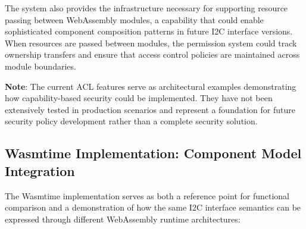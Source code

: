 The system also provides the infrastructure necessary for supporting resource passing between WebAssembly modules, a capability that could enable sophisticated component composition patterns in future I2C interface versions. When resources are passed between modules, the permission system could track ownership transfers and ensure that access control policies are maintained across module boundaries.

\textbf{Note}: The current ACL features serve as architectural examples demonstrating how capability-based security could be implemented. They have not been extensively tested in production scenarios and represent a foundation for future security policy development rather than a complete security solution.

\subsection{Wasmtime Implementation: Component Model Integration}

The Wasmtime implementation serves as both a reference point for functional comparison and a demonstration of how the same I2C interface semantics can be expressed through different WebAssembly runtime architectures:

